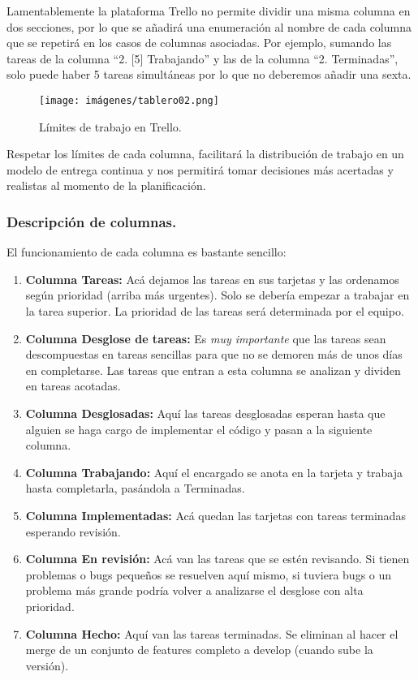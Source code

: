Lamentablemente la plataforma Trello no permite dividir una misma columna en dos secciones, por lo que se añadirá una enumeración al nombre de cada columna que se repetirá en los casos de columnas asociadas. Por ejemplo, sumando las tareas de la columna “2. [5] Trabajando” y las de la columna “2. Terminadas”, solo puede haber 5 tareas simultáneas por lo que no deberemos añadir una sexta.

\begin{figure}[h]
	\centering
	\caption{Límites de trabajo en Trello.}
	\texttt{[image: imágenes/tablero02.png]}
\end{figure}

Respetar los límites de cada columna, facilitará la distribución de trabajo en un modelo de entrega continua y nos permitirá tomar decisiones más acertadas y realistas al momento de la planificación.

\subsubsection{Descripción de columnas.}\label{flujo:descripcion-de-columnas}
El funcionamiento de cada columna es bastante sencillo:
\begin{enumerate}
	\item \textbf{Columna Tareas:} Acá dejamos las tareas en sus tarjetas y las ordenamos según prioridad (arriba más urgentes). Solo se debería empezar a trabajar en la tarea superior. La prioridad de las tareas será determinada por el equipo.
	\item \textbf{Columna Desglose de tareas:} Es \textit{muy importante} que las tareas sean descompuestas en tareas sencillas para que no se demoren más de unos días en completarse. Las tareas que entran a esta columna se analizan y dividen en tareas acotadas.
	\item \textbf{Columna Desglosadas:} Aquí las tareas desglosadas esperan hasta que alguien se haga cargo de implementar el código y pasan a la siguiente columna.
	\item \textbf{Columna Trabajando:} Aquí el encargado se anota en la tarjeta y trabaja hasta completarla, pasándola a Terminadas.
	\item \textbf{Columna Implementadas:} Acá quedan las tarjetas con tareas terminadas esperando revisión.
	\item \textbf{Columna En revisión:} Acá van las tareas que se estén revisando. Si tienen problemas o bugs pequeños se resuelven aquí mismo, si tuviera bugs o un problema más grande podría volver a analizarse el desglose con alta prioridad.
	\item \textbf{Columna Hecho:} Aquí van las tareas terminadas. Se eliminan al hacer el merge de un conjunto de features completo a develop (cuando sube la versión).
\end{enumerate}


